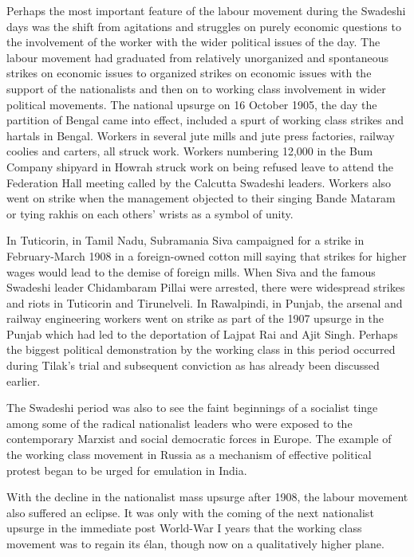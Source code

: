 Perhaps the most important feature of the labour movement during the Swadeshi days was the shift from agitations and struggles on purely economic questions to the involvement of the worker with the wider political issues of the day. The labour movement had graduated from relatively unorganized and spontaneous strikes on economic issues to organized strikes on economic issues with the support of the nationalists and then on to working class involvement in wider political movements. The national upsurge on 16 October 1905, the day the partition of Bengal came into effect, included a spurt of working class strikes and hartals in Bengal. Workers in several jute mills and jute press factories, railway coolies and carters, all struck work. Workers numbering 12,000 in the Bum Company shipyard in Howrah struck work on being refused leave to attend the Federation Hall meeting called by the Calcutta Swadeshi leaders. Workers also went on strike when the management objected to their singing Bande Mataram or tying rakhis on each others' wrists as a symbol of unity.

In Tuticorin, in Tamil Nadu, Subramania Siva campaigned for a strike in February-March 1908 in a foreign-owned cotton mill saying that strikes for higher wages would lead to the demise of foreign mills. When Siva and the famous Swadeshi leader Chidambaram Pillai were arrested, there were widespread strikes and riots in Tuticorin and Tirunelveli. In Rawalpindi, in Punjab, the arsenal and railway engineering workers went on strike as part of the 1907 upsurge in the Punjab which had led to the deportation of Lajpat Rai and Ajit Singh. Perhaps the biggest political demonstration by the working class in this period occurred during Tilak's trial and subsequent conviction as has already been discussed earlier.

The Swadeshi period was also to see the faint beginnings of a socialist tinge among some of the radical nationalist leaders who were exposed to the contemporary Marxist and social democratic forces in Europe. The example of the working class movement in Russia as a mechanism of effective political protest began to be urged for emulation in India.

With the decline in the nationalist mass upsurge after 1908, the labour movement also suffered an eclipse. It was only with the coming of the next nationalist upsurge in the immediate post World-War I years that the working class movement was to regain its élan, though now on a qualitatively higher plane.


